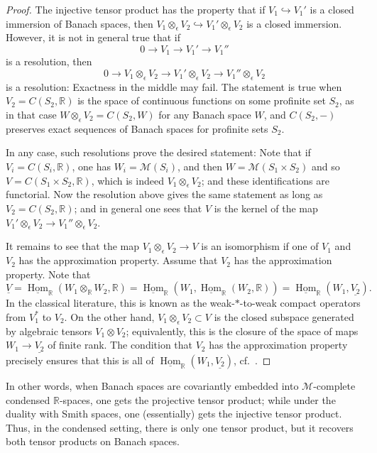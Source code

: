 \documentclass[11pt]{amsbook}
\DeclareMathOperator{\Hom}{Hom}
\newcommand{\intHom}{\underline{\Hom}}
\numberwithin{equation}{section}
\numberwithin{theorem}{section}
\theoremstyle{definition}
\begin{document}
\begin{proof} The injective tensor product has the property that if $V_1\hookrightarrow V_1'$ is a closed immersion of Banach spaces, then $V_1\otimes_\epsilon V_2\hookrightarrow V_1'\otimes_\epsilon V_2$ is a closed immersion. However, it is not in general true that if
\[
0\to V_1\to V_1'\to V_1''
\]
is a resolution, then
\[
0\to V_1\otimes_\epsilon V_2\to V_1'\otimes_\epsilon V_2\to V_1''\otimes_\epsilon V_2
\]
is a resolution: Exactness in the middle may fail. The statement is true when $V_2=C(S_2,\mathbb R)$ is the space of continuous functions on some profinite set $S_2$, as in that case $W\otimes_\epsilon V_2 = C(S_2,W)$ for any Banach space $W$, and $C(S_2,-)$ preserves exact sequences of Banach spaces for profinite sets $S_2$.

In any case, such resolutions prove the desired statement: Note that if $V_i=C(S_i,\mathbb R)$, one has $W_i=\mathcal M(S_i)$, and then $W=\mathcal M(S_1\times S_2)$ and so $V=C(S_1\times S_2,\mathbb R)$, which is indeed $V_1\otimes_\epsilon V_2$; and these identifications are functorial. Now the resolution above gives the same statement as long as $V_2=C(S_2,\mathbb R)$; and in general one sees that $V$ is the kernel of the map $V_1'\otimes_\epsilon V_2\to V_1''\otimes_\epsilon V_2$.

It remains to see that the map $V_1\otimes_\epsilon V_2\to V$ is an isomorphism if one of $V_1$ and $V_2$ has the approximation property. Assume that $V_2$ has the approximation property. Note that
\[
\underline{V}=\intHom_{\mathbb R}(W_1\otimes_{\mathbb R} W_2,\mathbb R) = \intHom_{\mathbb R}(W_1,\intHom_{\mathbb R}(W_2,\mathbb R)) = \intHom_{\mathbb R}(W_1,\underline{V_2}).
\]
In the classical literature, this is known as the weak-$\ast$-to-weak compact operators from $V_1^\ast$ to $V_2$. On the other hand, $V_1\otimes_\epsilon V_2\subset V$ is the closed subspace generated by algebraic tensors $V_1\otimes V_2$; equivalently, this is the closure of the space of maps $W_1\to \underline{V_2}$ of finite rank. The condition that $V_2$ has the approximation property precisely ensures that this is all of $\intHom_{\mathbb R}(W_1,\underline{V_2})$, cf.~\cite[Theorem 1.3.11]{GrothResumeRevisited}.
\end{proof}

In other words, when Banach spaces are covariantly embedded into $\mathcal M$-complete condensed $\mathbb R$-spaces, one gets the projective tensor product; while under the duality with Smith spaces, one (essentially) gets the injective tensor product. Thus, in the condensed setting, there is only one tensor product, but it recovers both tensor products on Banach spaces.
\end{document}
